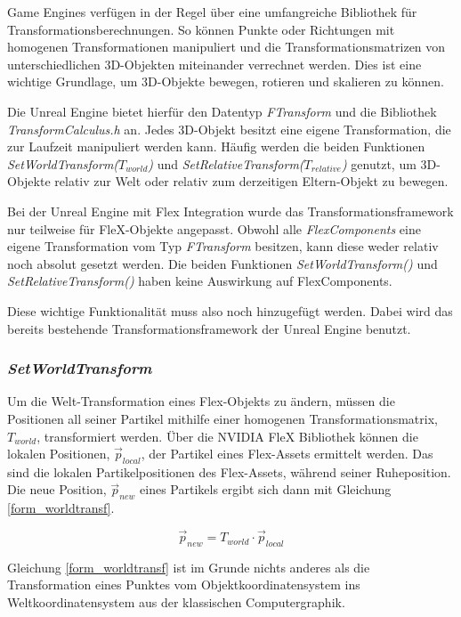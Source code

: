 Game Engines verfügen in der Regel über eine umfangreiche Bibliothek für Transformationsberechnungen. So können Punkte oder Richtungen mit homogenen Transformationen manipuliert und die Transformationsmatrizen von unterschiedlichen 3D-Objekten miteinander verrechnet werden.
Dies ist eine wichtige Grundlage, um 3D-Objekte bewegen, rotieren und skalieren zu können. 

Die Unreal Engine bietet hierfür den Datentyp \textit{FTransform} und die Bibliothek \textit{TransformCalculus.h} an. Jedes 3D-Objekt besitzt eine eigene Transformation, die zur Laufzeit manipuliert werden kann. Häufig werden die beiden Funktionen \newline \textit{SetWorldTransform($T_{world}$)} und \textit{SetRelativeTransform($T_{relative}$)} genutzt, um 3D-Objekte relativ zur Welt oder relativ zum derzeitigen Eltern-Objekt zu bewegen.

Bei der Unreal Engine mit Flex Integration wurde das Transformationsframework nur teilweise für FleX-Objekte angepasst. Obwohl alle \textit{FlexComponents} eine eigene Transformation vom Typ \textit{FTransform} besitzen, kann diese weder relativ noch absolut gesetzt werden. Die beiden Funktionen \textit{SetWorldTransform()} und \textit{SetRelativeTransform()} haben keine Auswirkung auf FlexComponents.

Diese wichtige Funktionalität muss also noch hinzugefügt werden. Dabei wird das bereits bestehende Transformationsframework der Unreal Engine benutzt.

\subsubsection{\textit{SetWorldTransform}}

Um die Welt-Transformation eines Flex-Objekts zu ändern, müssen die Positionen all seiner Partikel mithilfe einer homogenen Transformationsmatrix, $T_{world}$, transformiert werden. Über die NVIDIA FleX Bibliothek können die lokalen Positionen, $\vec{p}_{local}$, der Partikel eines Flex-Assets ermittelt werden. Das sind die lokalen Partikelpositionen des Flex-Assets, während seiner Ruheposition. Die neue Position, $\vec{p}_{new}$ eines Partikels ergibt sich dann mit Gleichung \ref{form_worldtransf}.

\begin{equation}
\vec{p}_{new} = T_{world} \cdot \vec{p}_{local}
\label{form_worldtransf}
\end{equation}

Gleichung \ref{form_worldtransf} ist im Grunde nichts anderes als die Transformation eines Punktes vom Objektkoordinatensystem ins Weltkoordinatensystem aus der klassischen Computergraphik. 

